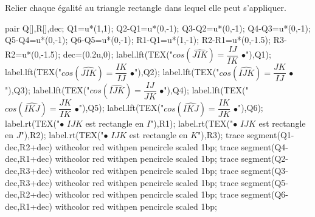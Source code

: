         Relier chaque égalité au triangle rectangle dans lequel elle peut s'appliquer.
    \begin{center}
        \begin{Geometrie}[CoinBG={(-2u,-5u)}]
            pair Q[],R[],dec;
            Q1=u*(1,1);
            Q2-Q1=u*(0,-1);
            Q3-Q2=u*(0,-1);
            Q4-Q3=u*(0,-1);
            Q5-Q4=u*(0,-1);
            Q6-Q5=u*(0,-1);
            R1-Q1=u*(1,-1);
            R2-R1=u*(0,-1.5);
            R3-R2=u*(0,-1.5);
            dec=(0.2u,0);
            label.lft(TEX("$cos(\widehat{JIK})=\dfrac{IJ}{IK}$ $\bullet$"),Q1);
            label.lft(TEX("$cos(\widehat{JIK})=\dfrac{IK}{IJ}$ $\bullet$"),Q2);
            label.lft(TEX("$cos(\widehat{IJK})=\dfrac{JK}{IJ}$ $\bullet$"),Q3);
            label.lft(TEX("$cos(\widehat{IJK})=\dfrac{IJ}{JK}$ $\bullet$"),Q4);
            label.lft(TEX("$cos(\widehat{IKJ})=\dfrac{JK}{IK}$ $\bullet$"),Q5);
            label.lft(TEX("$cos(\widehat{IKJ})=\dfrac{IK}{JK}$ $\bullet$"),Q6);
            label.rt(TEX("$\bullet$ $IJK$ est rectangle en $I$"),R1);
            label.rt(TEX("$\bullet$ $IJK$ est rectangle en $J$"),R2);
            label.rt(TEX("$\bullet$ $IJK$ est rectangle en $K$"),R3);
            trace segment(Q1-dec,R2+dec) withcolor red withpen pencircle scaled 1bp;
            trace segment(Q4-dec,R1+dec) withcolor red withpen pencircle scaled 1bp;
            trace segment(Q2-dec,R3+dec) withcolor red withpen pencircle scaled 1bp;
            trace segment(Q3-dec,R3+dec) withcolor red withpen pencircle scaled 1bp;
            trace segment(Q5-dec,R2+dec) withcolor red withpen pencircle scaled 1bp;
            trace segment(Q6-dec,R1+dec) withcolor red withpen pencircle scaled 1bp;
        \end{Geometrie}
    \end{center}
